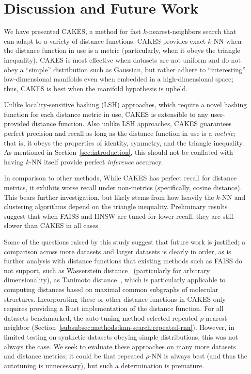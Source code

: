 \section{Discussion and Future Work}
\label{sec:discussion}

We have presented CAKES, a method for fast $k$-nearest-neighbors search that can adapt to a variety of distance functions.
CAKES provides exact $k$-NN when the distance function in use is a metric (particularly, when it obeys the triangle inequality).
CAKES is most effective when datasets are not uniform and do not obey a ``simple'' distribution such as Gaussian, but rather adhere to ``interesting'' low-dimensional manifolds even when embedded in a high-dimensional space; thus, CAKES is best when the manifold hypothesis is upheld.

Unlike locality-sensitive hashing (LSH) approaches, which require a novel hashing function for each distance metric in use, CAKES is extensible to any user-provided distance function.
Also unlike LSH approaches, CAKES guarantees perfect precision and recall as long as the distance function in use is a \emph{metric}; that is, it obeys the properties of identity, symmetry, and the triangle inequality.
As mentioned in Section~\ref{sec:introduction}, this should not be conflated with having $k$-NN itself provide perfect \emph{inference} accuracy.

In comparison to other methods, While CAKES has perfect recall for distance metrics, it exhibits worse recall under non-metrics (specifically, cosine distance). This bears further investigation, but likely stems from how heavily the $k$-NN and clustering algorithms depend on the triangle inequality.
Preliminary results suggest that when FAISS and HNSW are tuned for lower recall, they are still slower than CAKES in all cases.

Some of the questions raised by this study suggest that future work is justified; a comparison across more datasets and larger datasets is clearly in order, as is further analysis with distance functions that existing methods such as FAISS do not support, such as Wasserstein distance~\cite{vallender1974calculation} (particularly for arbitrary dimensionality), as Tanimoto distance~\cite{bajusz2015tanimoto}, which is particularly applicable to computing distances based on maximal common subgraphs of molecular structures.
Incorporating these or other distance functions in CAKES only requires providing a Rust implementation of the distance function.
For all datasets benchmarked, the auto-tuning method selected repeated $\rho$-nearest neighbor (Section~\ref{subsubsec:methods:knn-search:repeated-rnn}).
However, in limited testing on synthetic datasets obeying simple distributions, this was not always the case.
We seek to evaluate these approaches on many more datasets and distance metrics; it could be that repeated $\rho$-NN is always best (and thus the autotuning is unnecessary), but such a determination is premature.

